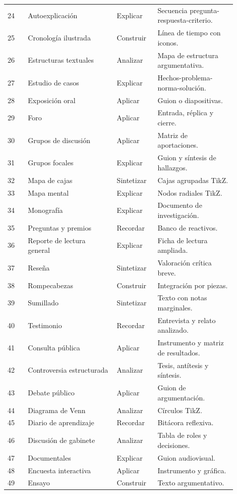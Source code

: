 \begin{longtable}{@{}p{0.08\linewidth}p{0.35\linewidth}p{0.16\linewidth}p{0.31\linewidth}@{}}
24 & Autoexplicación & Explicar & Secuencia pregunta-respuesta-criterio. \\
25 & Cronología ilustrada & Construir & Línea de tiempo con iconos. \\
26 & Estructuras textuales & Analizar & Mapa de estructura argumentativa. \\
27 & Estudio de casos & Explicar & Hechos-problema-norma-solución. \\
28 & Exposición oral & Aplicar & Guion o diapositivas. \\
29 & Foro & Aplicar & Entrada, réplica y cierre. \\
30 & Grupos de discusión & Aplicar & Matriz de aportaciones. \\
31 & Grupos focales & Explicar & Guion y síntesis de hallazgos. \\
32 & Mapa de cajas & Sintetizar & Cajas agrupadas TikZ. \\
33 & Mapa mental & Explicar & Nodos radiales TikZ. \\
34 & Monografía & Explicar & Documento de investigación. \\
35 & Preguntas y premios & Recordar & Banco de reactivos. \\
36 & Reporte de lectura general & Explicar & Ficha de lectura ampliada. \\
37 & Reseña & Sintetizar & Valoración crítica breve. \\
38 & Rompecabezas & Construir & Integración por piezas. \\
39 & Sumillado & Sintetizar & Texto con notas marginales. \\
40 & Testimonio & Recordar & Entrevista y relato analizado. \\
41 & Consulta pública & Aplicar & Instrumento y matriz de resultados. \\
42 & Controversia estructurada & Analizar & Tesis, antítesis y síntesis. \\
43 & Debate público & Aplicar & Guion de argumentación. \\
44 & Diagrama de Venn & Analizar & Círculos TikZ. \\
45 & Diario de aprendizaje & Recordar & Bitácora reflexiva. \\
46 & Discusión de gabinete & Analizar & Tabla de roles y decisiones. \\
47 & Documentales & Explicar & Guion audiovisual. \\
48 & Encuesta interactiva & Aplicar & Instrumento y gráfica. \\
49 & Ensayo & Construir & Texto argumentativo. \\

\end{longtable}
